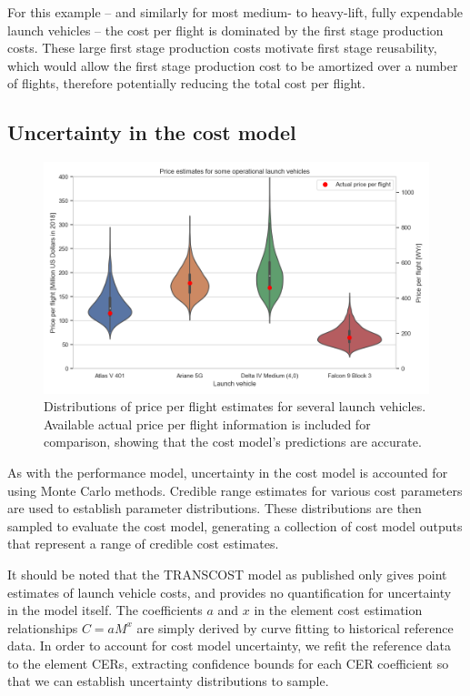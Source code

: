 \documentclass{iaf-iac}
\begin{document}
\begin{multicols}{2}
For this example -- and similarly for most medium- to heavy-lift, fully expendable launch vehicles -- the cost per flight is dominated by the first stage production costs. These large first stage production costs motivate first stage reusability, which would allow the first stage production cost to be amortized over a number of flights, therefore potentially reducing the total cost per flight. 

\subsection{Uncertainty in the cost model} \label{sec:uncert_cost_model}

\begin{figure}
    \centering
    \includegraphics[width=\textwidth]{../../lvreuse/analysis/cost/plots/vehicle_ppf_validation}
    \caption{\label{fig:vehicle_ppf_validation} Distributions of price per flight estimates for several launch vehicles. Available actual price per flight information is included for comparison, showing that the cost model's predictions are accurate.}
\end{figure}

As with the performance model, uncertainty in the cost model is accounted for using Monte Carlo methods. Credible range estimates for various cost parameters are used to establish parameter distributions. These distributions are then sampled to evaluate the cost model, generating a collection of cost model outputs that represent a range of credible cost estimates.

It should be noted that the TRANSCOST model as published only gives point estimates of launch vehicle costs, and provides no quantification for uncertainty in the model itself. The coefficients $a$ and $x$ in the element cost estimation relationships $C = a M^x$ are simply derived by curve fitting to historical reference data. In order to account for cost model uncertainty, we refit the reference data to the element CERs, extracting confidence bounds for each CER coefficient so that we can establish uncertainty distributions to sample. 


\end{multicols}
\end{document}
